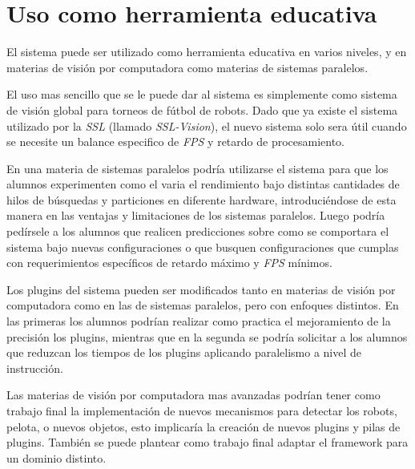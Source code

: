 
\section{Uso como herramienta educativa}

\label{usoEducativo}

El sistema puede ser utilizado como herramienta educativa en varios niveles, y
en materias de visión por computadora como materias de sistemas paralelos.

El uso mas sencillo que se le puede dar al sistema es simplemente como sistema
de visión global para torneos de fútbol de robots.  Dado que ya existe el
sistema utilizado por la \emph{SSL} (llamado \emph{SSL-Vision}), el nuevo
sistema solo sera útil cuando se necesite un balance especifico de \emph{FPS} y
retardo de procesamiento.

En una materia de sistemas paralelos podría utilizarse el sistema para que los
alumnos experimenten como el varia el rendimiento bajo distintas cantidades de
hilos de búsquedas y particiones en diferente hardware, introduciéndose de esta
manera en las ventajas y limitaciones de los sistemas paralelos. Luego podría
pedírsele a los alumnos que realicen predicciones sobre como se comportara el
sistema bajo nuevas configuraciones o que busquen configuraciones que cumplas
con requerimientos específicos de retardo máximo y \emph{FPS} mínimos.

Los plugins del sistema pueden ser modificados tanto en materias de visión por
computadora como en las de sistemas paralelos, pero con enfoques distintos. En
las primeras los alumnos podrían realizar como practica el mejoramiento de la
precisión los plugins, mientras que en la segunda se podría solicitar a los
alumnos que reduzcan los tiempos de los plugins aplicando paralelismo a nivel de
instrucción.

Las materias de visión por computadora mas avanzadas podrían tener como trabajo
final la implementación de nuevos mecanismos para detectar los robots, pelota, o
nuevos objetos, esto implicaría la creación de nuevos plugins y pilas de
plugins. También se puede plantear como trabajo final adaptar el framework para
un dominio distinto.
